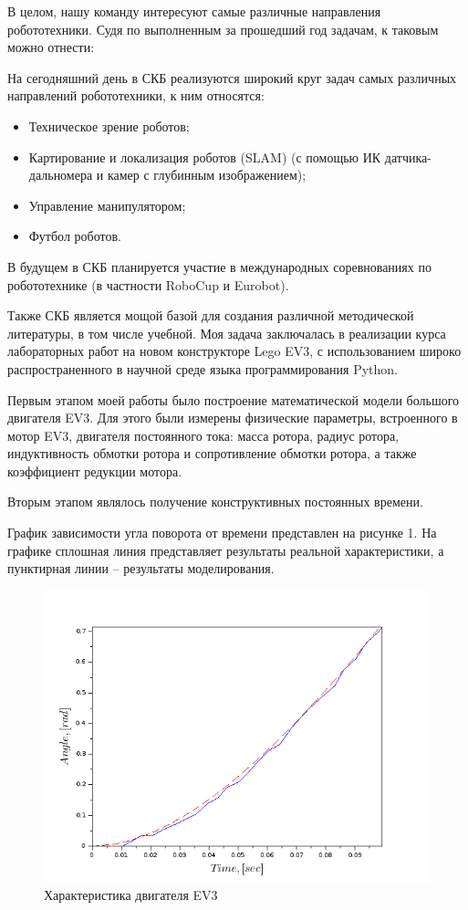 \documentclass[a4paper,14pt]{extreport}
\begin{document}
	В целом, нашу команду интересуют самые различные направления робототехники. Судя по выполненным за прошедший год задачам, к таковым можно отнести:
	
	На сегодняшний день в СКБ реализуются широкий круг задач самых различных направлений робототехники, к ним относятся:
	\begin{itemize}
		\item Техническое зрение роботов;
		\item Картирование и локализация роботов (SLAM) (с помощью ИК датчика-дальномера и камер с глубинным изображением);
		\item Управление манипулятором;
		\item Футбол роботов.
	\end{itemize}
	
	В будущем в СКБ планируется участие в международных соревнованиях по робототехнике (в частности RoboCup и Eurobot). 
	
	Также СКБ является мощой базой для создания различной методической литературы, в том числе учебной. Моя задача заключалась в реализации курса лабораторных работ на новом конструкторе Lego EV3, с использованием широко распространенного в научной среде языка программирования Python.
	
	Первым этапом моей работы было построение математической модели большого двигателя EV3. Для этого были измерены физические параметры, встроенного в мотор EV3, двигателя постоянного тока: масса ротора, радиус ротора, индуктивность обмотки ротора и сопротивление обмотки ротора, а также коэффициент редукции мотора. 
	
	Вторым этапом являлось получение конструктивных постоянных времени.
	
	График зависимости угла поворота от времени представлен на рисунке 1.
	На графике сплошная линия представляет результаты реальной характеристики, а пунктирная линии -- результаты моделирования.
	
	\begin{figure}[h]
		\center\includegraphics[width=0.8\linewidth]{angle_time.png}
		\caption{Характеристика двигателя EV3}
		\label{fig:scr1}
	\end{figure}
	
\end{document}
